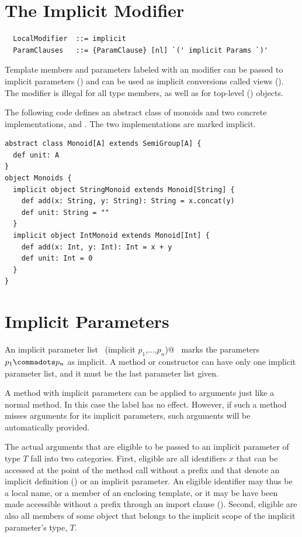 \section{The Implicit Modifier}\label{sec:impl-defs}

\syntax\begin{lstlisting}
  LocalModifier  ::= implicit
  ParamClauses   ::= {ParamClause} [nl] `(' implicit Params `)'
\end{lstlisting}

Template members and parameters labeled with an 
modifier can be passed to implicit parameters ()
and can be used as implicit conversions called views
(). The  modifier is illegal for all
type members, as well as for top-level ()
objects.

\example\label{ex:impl-monoid}
The following code defines an abstract class of monoids and
two concrete implementations,  and
. The two implementations are marked implicit.

\begin{lstlisting}
abstract class Monoid[A] extends SemiGroup[A] {
  def unit: A
}
object Monoids {
  implicit object StringMonoid extends Monoid[String] {
    def add(x: String, y: String): String = x.concat(y)
    def unit: String = ""
  }
  implicit object IntMonoid extends Monoid[Int] {
    def add(x: Int, y: Int): Int = x + y
    def unit: Int = 0
  }
}
\end{lstlisting}

\section{Implicit Parameters}\label{sec:impl-params}

An implicit parameter list
~\lstinline@(implicit $p_1$,$\ldots$,$p_n$)@~ marks the parameters $p_1 \commadots p_n$ as
implicit. A method or constructor can have only one implicit parameter
list, and it must be the last parameter list given.

A method with implicit parameters can be applied to arguments just
like a normal method. In this case the  label has no
effect. However, if such a method misses arguments for its implicit
parameters, such arguments will be automatically provided.

The actual arguments that are eligible to be passed to an implicit
parameter of type $T$ fall into two categories. First, eligible are
all identifiers $x$ that can be accessed at the point of the method
call without a prefix and that denote an implicit definition
() or an implicit parameter.  An eligible
identifier may thus be a local name, or a member of an enclosing
template, or it may be have been made accessible without a prefix
through an import clause (). Second, eligible are
also all  members of some object that belongs to the
implicit scope of the implicit parameter's type, $T$.

